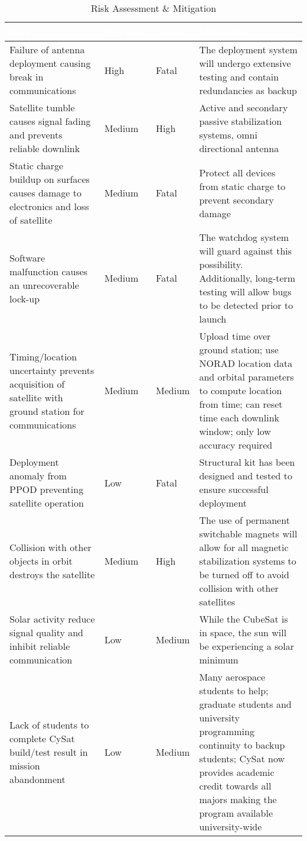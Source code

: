\documentclass[nocover]            %
{CSLI}                       %
\begin{document}
\begin{table}[H]
\centering
\caption{Risk Assessment \& Mitigation}
\begin{tabular}{| p{} | p{} | p{} | p{}|}
\arrayrulecolor{white}
\hline
\rowcolor{gray!80}
\textcolor{white}{\textbf{Risk}} & \textcolor{white}{\textbf{Prospect}} & \textcolor{white}{\textbf{Impact}} & \textcolor{white}{\textbf{Mitigation}} \\ \hline
\rowcolor{gray!10}
Failure of antenna deployment causing break in communications & High & Fatal &The deployment system will undergo extensive testing and contain redundancies as backup \\ \hline
\rowcolor{gray!5}
Satellite tumble causes signal fading and prevents reliable downlink & Medium & High & Active and secondary passive stabilization systems, omni directional antenna\\ \hline
\rowcolor{gray!10}
Static charge buildup on surfaces causes damage to electronics and loss of satellite & Medium & Fatal & Protect all devices from static charge to prevent secondary damage \\ \hline
\rowcolor{gray!5}
Software malfunction causes an unrecoverable lock-up & Medium & Fatal & The watchdog system will guard against this possibility. Additionally, long-term testing will allow bugs to be detected prior to launch\\ \hline
\rowcolor{gray!10}
Timing/location uncertainty prevents acquisition of satellite with ground station for communications & Medium & Medium & Upload time over ground station; use NORAD location data and orbital parameters to compute location from time; can reset time each downlink window; only low accuracy required \\ \hline
\rowcolor{gray!5}
Deployment anomaly from PPOD preventing satellite operation & Low & Fatal & Structural kit has been designed and tested to ensure successful deployment \\ \hline
\rowcolor{gray!10}
Collision with other objects in orbit destroys the satellite & Medium & High & The use of permanent switchable magnets will allow for all magnetic stabilization systems to be turned off to avoid collision with other satellites\\ \hline
\rowcolor{gray!5}
Solar activity reduce signal quality and inhibit reliable communication & Low & Medium & While the CubeSat is in space, the sun will be experiencing a solar minimum\\ \hline
\rowcolor{gray!10}
Lack of students to complete CySat build/test result in mission abandonment & Low & Medium & Many aerospace students to help; graduate students and university programming continuity to backup students; CySat now provides academic credit towards all majors making the program available university-wide \\ \hline
\end{tabular}
\end{table}
\end{document}
